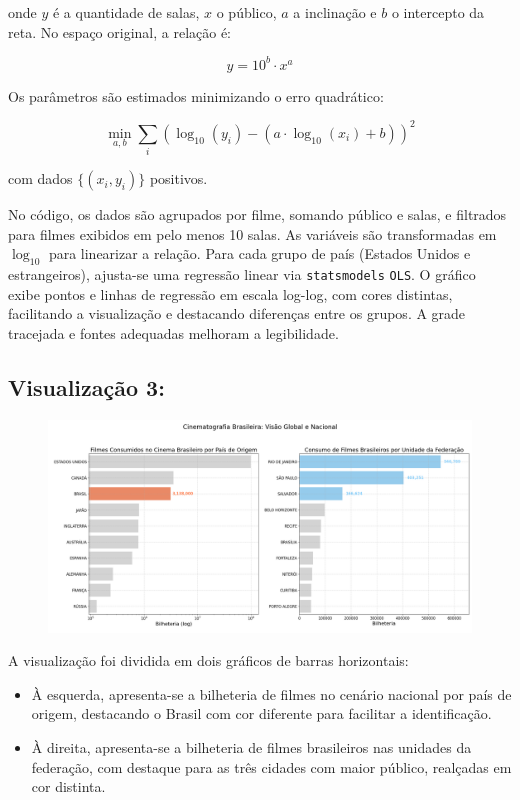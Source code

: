 \documentclass{article}
\begin{document}
onde \(y\) é a quantidade de salas, \(x\) o público, \(a\) a inclinação e \(b\) o intercepto da reta. No espaço original, a relação é:

\[
y = 10^{b} \cdot x^{a}
\]

Os parâmetros são estimados minimizando o erro quadrático:

\[
\min_{a,b} \sum_{i} \left( \log_{10}(y_i) - (a \cdot \log_{10}(x_i) + b) \right)^2
\]

com dados \(\{(x_i,y_i)\}\) positivos.

No código, os dados são agrupados por filme, somando público e salas, e filtrados para filmes exibidos em pelo menos 10 salas. As variáveis são transformadas em \(\log_{10}\) para linearizar a relação. Para cada grupo de país (Estados Unidos e estrangeiros), ajusta-se uma regressão linear via \texttt{statsmodels} \texttt{OLS}. O gráfico exibe pontos e linhas de regressão em escala log-log, com cores distintas, facilitando a visualização e destacando diferenças entre os grupos. A grade tracejada e fontes adequadas melhoram a legibilidade.

\subsection*{Visualização 3:}
\begin{figure}[H]
    \centerline{\includegraphics[width = \linewidth]{img/Figure_3.png}}
\end{figure}
A visualização foi dividida em dois gráficos de barras horizontais:

\begin{itemize}
    \item À esquerda, apresenta-se a bilheteria de filmes no cenário nacional por país de origem, destacando o Brasil com cor diferente para facilitar a identificação.
    \item À direita, apresenta-se a bilheteria de filmes brasileiros nas unidades da federação, com destaque para as três cidades com maior público, realçadas em cor distinta.
\end{itemize}
\end{document}
